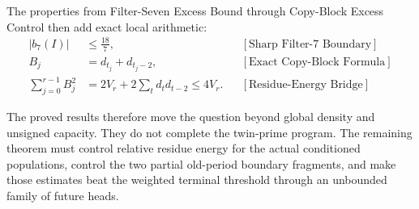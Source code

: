 The properties from Filter-Seven Excess Bound through Copy-Block Excess Control then add exact local arithmetic:
\begin{equation*}
\begin{aligned}
|b_7(I)|&\le\frac{18}{7},
&&[\text{Sharp Filter-7 Boundary}]\\
B_j&=d_{t_j}+d_{t_j-2},
&&[\text{Exact Copy-Block Formula}]\\
\sum_{j=0}^{r-1}B_j^2
&=2V_r+2\sum_td_td_{t-2}
\le4V_r.
&&[\text{Residue-Energy Bridge}]
\end{aligned}
\end{equation*}

The proved results therefore move the question beyond global density and
unsigned capacity. They do not complete the twin-prime program. The remaining
theorem must control relative residue energy for the actual conditioned
populations, control the two partial old-period boundary fragments, and make
those estimates beat the weighted terminal threshold through an unbounded
family of future heads.

